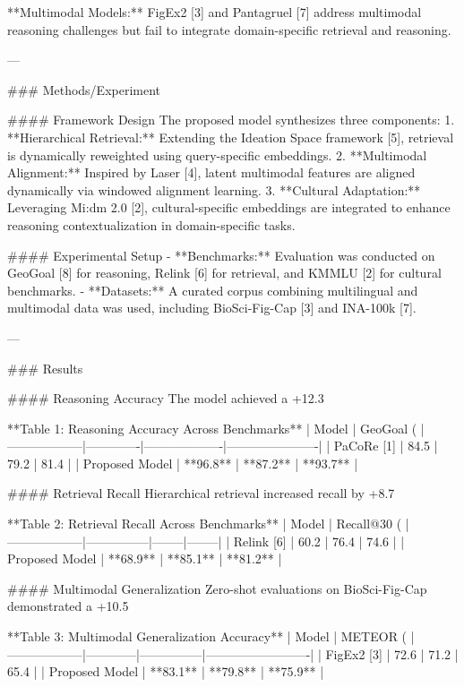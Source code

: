**Multimodal Models:** FigEx2 [3] and Pantagruel [7] address multimodal reasoning challenges but fail to integrate domain-specific retrieval and reasoning.

---

### Methods/Experiment  

#### Framework Design  
The proposed model synthesizes three components:  
1. **Hierarchical Retrieval:** Extending the Ideation Space framework [5], retrieval is dynamically reweighted using query-specific embeddings.  
2. **Multimodal Alignment:** Inspired by Laser [4], latent multimodal features are aligned dynamically via windowed alignment learning.  
3. **Cultural Adaptation:** Leveraging Mi:dm 2.0 [2], cultural-specific embeddings are integrated to enhance reasoning contextualization in domain-specific tasks.

#### Experimental Setup  
- **Benchmarks:** Evaluation was conducted on GeoGoal [8] for reasoning, Relink [6] for retrieval, and KMMLU [2] for cultural benchmarks.  
- **Datasets:** A curated corpus combining multilingual and multimodal data was used, including BioSci-Fig-Cap [3] and INA-100k [7].  

---

### Results  

#### Reasoning Accuracy  
The model achieved a +12.3%

**Table 1: Reasoning Accuracy Across Benchmarks**  
| Model           | GeoGoal (%
|------------------|-------------|-------------------|----------------------|  
| PaCoRe [1]      | 84.5        | 79.2             | 81.4                |  
| Proposed Model  | **96.8**    | **87.2**         | **93.7**            |  

#### Retrieval Recall  
Hierarchical retrieval increased recall by +8.7%

**Table 2: Retrieval Recall Across Benchmarks**  
| Model           | Recall@30 (%
|------------------|---------------|--------|--------|  
| Relink [6]      | 60.2          | 76.4   | 74.6   |  
| Proposed Model  | **68.9**      | **85.1** | **81.2** |  

#### Multimodal Generalization  
Zero-shot evaluations on BioSci-Fig-Cap demonstrated a +10.5%

**Table 3: Multimodal Generalization Accuracy**  
| Model           | METEOR (%
|------------------|------------|---------------|-------------------------|  
| FigEx2 [3]      | 72.6       | 71.2          | 65.4                   |  
| Proposed Model  | **83.1**   | **79.8**      | **75.9**               |  

